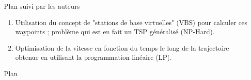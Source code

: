 \begin{frame}{Plan suivi par les auteurs}
 
\begin{enumerate}
	\suite
	\item Utilisation du concept de "stations de base virtuelles" (VBS) pour calculer ces waypoints ;  problème qui est en fait un TSP généralisé (NP-Hard).

	\item Optimisation de la vitesse en fonction du temps le long de la trajectoire obtenue
	en utilisant la programmation linéaire (LP).

\end{enumerate}

\end{frame}


\begin{frame}{Plan}
\tableofcontents
\end{frame}